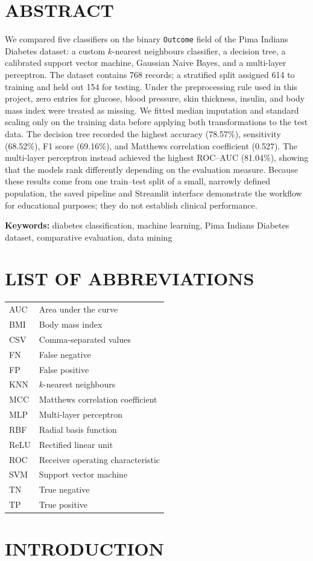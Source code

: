 \documentclass[pdflatex,sn-vancouver-num]{sn-jnl}
\newcommand{\reportabstract}{We compared five classifiers on the binary \texttt{Outcome} field of the Pima Indians Diabetes dataset: a custom $k$-nearest neighbours classifier, a decision tree, a calibrated support vector machine, Gaussian Naive Bayes, and a multi-layer perceptron. The dataset contains 768 records; a stratified split assigned 614 to training and held out 154 for testing. Under the preprocessing rule used in this project, zero entries for glucose, blood pressure, skin thickness, insulin, and body mass index were treated as missing. We fitted median imputation and standard scaling only on the training data before applying both transformations to the test data. The decision tree recorded the highest accuracy (78.57\%), sensitivity (68.52\%), F1 score (69.16\%), and Matthews correlation coefficient (0.527). The multi-layer perceptron instead achieved the highest ROC--AUC (81.04\%), showing that the models rank differently depending on the evaluation measure. Because these results come from one train--test split of a small, narrowly defined population, the saved pipeline and Streamlit interface demonstrate the workflow for educational purposes; they do not establish clinical performance.}
\newcommand{\reportkeywords}{diabetes classification, machine learning, Pima Indians Diabetes dataset, comparative evaluation, data mining}
\begin{document}
\setcounter{page}{1}
\pagestyle{plain}

\section*{ABSTRACT}
{}
\noindent\reportabstract\par
\vspace{0.5cm}
\noindent\textbf{Keywords:} \reportkeywords\par

\clearpage
\renewcommand{\contentsname}{TABLE OF CONTENTS}
\tableofcontents

\clearpage
{}
{}
\section*{LIST OF ABBREVIATIONS}
\vspace{0.5cm}
\begin{center}
\renewcommand{\arraystretch}{1.25}
\begin{tabular}{@{}p{}p{}@{}}
AUC & Area under the curve \\
BMI & Body mass index \\
CSV & Comma-separated values \\
FN & False negative \\
FP & False positive \\
KNN & $k$-nearest neighbours \\
MCC & Matthews correlation coefficient \\
MLP & Multi-layer perceptron \\
RBF & Radial basis function \\
ReLU & Rectified linear unit \\
ROC & Receiver operating characteristic \\
SVM & Support vector machine \\
TN & True negative \\
TP & True positive \\
\end{tabular}
\end{center}

\clearpage
{}
\setcounter{page}{1}

\section{INTRODUCTION}\label{sec:introduction}
\end{document}
